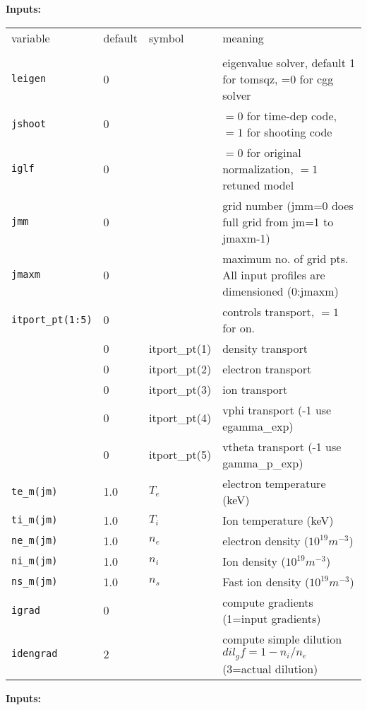 \noindent
{\bf Inputs:}
\begin{center}
\begin{tabular}{lllp{4.5in}}
variable & default & symbol & meaning \\
\\
{\tt leigen}    & 0 & & eigenvalue solver, default 1 for tomsqz, =0 for cgg solver \\
{\tt jshoot}    & 0 & & $=0$ for time-dep code, $=1$ for shooting code \\
{\tt iglf}      & 0 & & $=0$ for original normalization, $=1$ retuned model \\
{\tt jmm}       & 0 & & grid number (jmm=0 does full grid from jm=1 to jmaxm-1) \\
{\tt jmaxm}     & 0 & & maximum no. of grid pts. All input profiles are dimensioned (0:jmaxm) \\
{\tt itport\_pt(1:5)} & 0 & & controls transport, $=1$ for on. \\
                & 0 & itport\_pt(1) & density transport \\
                & 0 & itport\_pt(2) & electron transport \\
                & 0 & itport\_pt(3) & ion transport \\
                & 0 & itport\_pt(4) & vphi transport (-1 use egamma\_exp) \\
                & 0 & itport\_pt(5) & vtheta transport (-1 use gamma\_p\_exp)\\
{\tt te\_m(jm)}    & 1.0 & $T_e$ & electron temperature (keV) \\
{\tt ti\_m(jm)}    & 1.0 & $T_i$ & Ion temperature (keV) \\
{\tt ne\_m(jm)}    & 1.0 & $n_e$ & electron density ($10^{19} m^{-3}$) \\
{\tt ni\_m(jm)}    & 1.0 & $n_i$ & Ion density ($10^{19} m^{-3}$) \\
{\tt ns\_m(jm)}    & 1.0 & $n_s$ & Fast ion density ($10^{19} m^{-3}$) \\
{\tt igrad}        &   0 & & compute gradients (1=input gradients)\\
{\tt idengrad}     &   2 & & compute simple dilution $dil_gf=1-n_i/n_e$ (3=actual dilution)\\
\end{tabular}
\end{center}

\newpage

\noindent
{\bf Inputs:}

